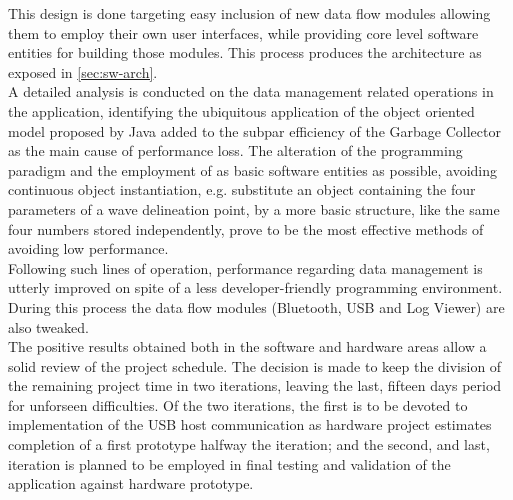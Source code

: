 			This design is done targeting easy inclusion of new data flow modules allowing them to employ their own user interfaces, while providing core level software entities for building those modules. This process produces the architecture as exposed in \autoref{sec:sw-arch}.\\

			A detailed analysis is conducted on the data management related operations in the application, identifying the ubiquitous application of the object oriented model proposed by Java added to the subpar efficiency of the Garbage Collector  as the main cause of performance loss. The alteration of the programming paradigm and the employment of as basic software entities as possible, avoiding continuous object instantiation, e.g. substitute an object containing the four parameters of a wave delineation point, by a more basic structure, like the same four numbers stored independently, prove to be the most effective methods of avoiding low performance.\\

			Following such lines of operation, performance regarding data management is utterly improved on spite of a less developer-friendly programming environment. During this process the data flow modules (Bluetooth, USB and Log Viewer) are also tweaked.\\

			The positive results obtained both in the software and hardware areas allow a solid review of the project schedule. The decision is made to keep the division of the remaining project time in two iterations, leaving the last, fifteen days period for unforseen difficulties. Of the two iterations, the first is to be devoted to implementation of the USB host communication as hardware project estimates completion of a first prototype halfway the iteration; and the second, and last, iteration is planned to be employed in final testing and validation of the application against hardware prototype.\\

